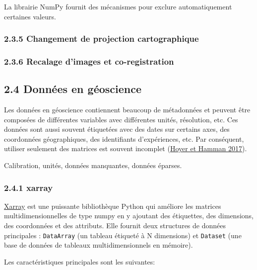 \documentclass[
]{article}
\begin{document}
La librairie NumPy fournit des mécanismes pour exclure automatiquement
certaines valeurs.

\subsubsection{\texorpdfstring{{2.3.5} Changement de projection
cartographique}{2.3.5 Changement de projection cartographique}}\label{changement-de-projection-cartographique}

\subsubsection{\texorpdfstring{{2.3.6} Recalage d'images et
co-registration}{2.3.6 Recalage d'images et co-registration}}\label{recalage-dimages-et-co-registration}

\subsection{\texorpdfstring{{2.4} Données en
géoscience}{2.4 Données en géoscience}}\label{donnuxe9es-en-guxe9oscience}

Les données en géoscience contiennent beaucoup de métadonnées et peuvent
être composées de différentes variables avec différentes unités,
résolution, etc. Ces données sont aussi souvent étiquetées avec des
dates sur certains axes, des coordonnées géographiques, des identifiants
d'expériences, etc. Par conséquent, utiliser seulement des matrices est
souvent incomplet {(\href{references.html\#ref-xarray-2017}{Hoyer et
Hamman 2017})}.

Calibration, unités, données manquantes, données éparses.

\subsubsection{\texorpdfstring{{2.4.1}
xarray}{2.4.1 xarray}}\label{xarray}

\href{https://docs.xarray.dev/en/latest/getting-started-guide/why-xarray.html}{Xarray}
est une puissante bibliothèque Python qui améliore les matrices
multidimensionnelles de type numpy en y ajoutant des étiquettes, des
dimensions, des coordonnées et des attributs. Elle fournit deux
structures de données principales : \texttt{DataArray} (un tableau
étiqueté à N dimensions) et \texttt{Dataset} (une base de données de
tableaux multidimensionnels en mémoire).

Les caractéristiques principales sont les suivantes:
\end{document}
